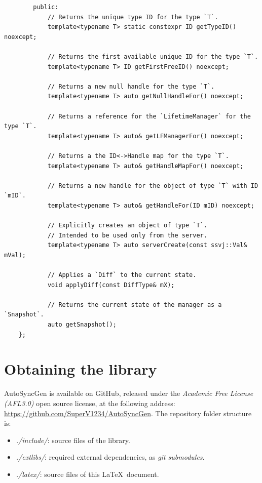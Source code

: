 \documentclass{report}
\begin{document}
\begin{verbatim}
        public:
            // Returns the unique type ID for the type `T`.
            template<typename T> static constexpr ID getTypeID() noexcept;

            // Returns the first available unique ID for the type `T`.
            template<typename T> ID getFirstFreeID() noexcept;

            // Returns a new null handle for the type `T`.
            template<typename T> auto getNullHandleFor() noexcept;
            
            // Returns a reference for the `LifetimeManager` for the type `T`.
            template<typename T> auto& getLFManagerFor() noexcept;

            // Returns a the ID<->Handle map for the type `T`.
            template<typename T> auto& getHandleMapFor() noexcept;

            // Returns a new handle for the object of type `T` with ID `mID`.
            template<typename T> auto& getHandleFor(ID mID) noexcept;

            // Explicitly creates an object of type `T`. 
            // Intended to be used only from the server.
            template<typename T> auto serverCreate(const ssvj::Val& mVal);

            // Applies a `Diff` to the current state.
            void applyDiff(const DiffType& mX);

            // Returns the current state of the manager as a `Snapshot`.
            auto getSnapshot();
    };
\end{verbatim}

    \newpage

    \chapter{Obtaining the library}

        AutoSyncGen is available on GitHub, released under the \emph{Academic Free License (AFL3.0)} open source license, at the following address: \url{https://github.com/SuperV1234/AutoSyncGen}.
        The repository folder structure is:

        \begin{itemize}
            \item \emph{./include/}: source files of the library.
            \item \emph{./extlibs/}: required external dependencies, as \emph{git submodules}.
            \item \emph{./latex/}: source files of this \LaTeX\ document.
        \end{itemize}
\end{document}
